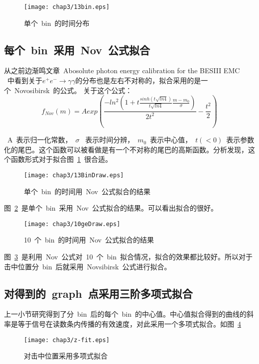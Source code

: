 \begin{figure}[htbp]
\centering
\texttt{[image: chap3/13bin.eps]}
\caption{单个~bin~的时间分布}
\label{fig:13bin}
\end{figure}

\subsection{每个~bin~采用~Nov~公式拟合}

从之前边渐鸣文章~Abosolute photon energy calibration for the BESIII EMC~ \cite{Bian:2010aa}~中看到关于${e^{+}e^{-} \to \gamma \gamma}$的分布也是左右不对称的，拟合采用的是一个~Novosibirsk\cite{Nov:2000aa}~的公式。
关于这个公式：
\begin{displaymath}
f_{Nov}(m)=Aexp(\frac{-ln^2(1+t\frac{sinh(t\sqrt{ln4})}{t\sqrt{ln4}}\frac{m-m_{0}}{\sigma})}{2t^2}-\frac{t^2}{2}) 
\end{displaymath}


~A~表示归一化常数，~$\sigma$~
表示时间分辨，~$m_{0}$~表示中心值，~$t(<0)$~表示参数化的尾巴。这个函数可以被看做是有一个不对称的尾巴的高斯函数。分析发现，这个函数形式对于拟合图~\ref{fig:13bin}~很合适。

\begin{figure}[htbp]
\centering
\texttt{[image: chap3/13BinDraw.eps]}
\caption{单个~bin~的时间用~Nov~公式拟合的结果}
\label{fig:13BinDraw}
\end{figure}

图~\ref{fig:13BinDraw}~是单个~bin~采用~Nov~公式拟合的结果。可以看出拟合的很好。

\begin{figure}[htbp]
\centering
\texttt{[image: chap3/10geDraw.eps]}
\caption{10~个~bin~的时间用~Nov~公式拟合的结果}
\label{fig:10geDraw}
\end{figure}
图~\ref{fig:10geDraw}~是利用~Nov~公式对~10~个~bin~拟合情况，拟合的效果都比较好。所以对于击中位置分~bin~后就采用~Novsibirsk~公式进行拟合。

\subsection{对得到的~graph~点采用三阶多项式拟合}
上一小节研究得到了分~bin~后的每个~bin~的中心值。中心值拟合得到的曲线的斜率是等于信号在读数条内传播的有效速度，对此采用一个多项式拟合。如图~\ref{fig:z-fit}~

\begin{figure}[htbp]
\centering
\texttt{[image: chap3/z-fit.eps]}
\caption{对击中位置采用多项式拟合}
\label{fig:z-fit}
\end{figure}
